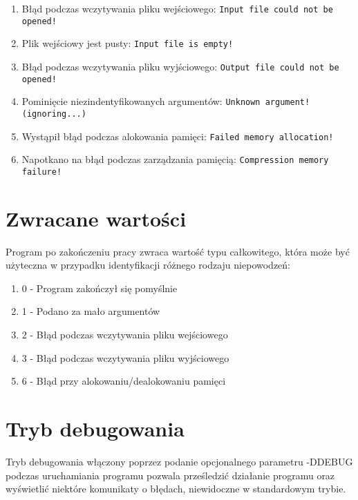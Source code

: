 \documentclass[]{article}
\begin{document}
\begin{enumerate}
\def\labelenumi{\arabic{enumi}.}
\item
  Błąd podczas wczytywania pliku wejściowego: \texttt{Input file could not be opened!}
\item
Plik wejściowy jest pusty: \texttt{Input file is empty!}
\item
Błąd podczas wczytywania pliku wyjściowego:  \texttt{Output file could not be opened!}
\item
Pominięcie niezindentyfikowanych argumentów: \texttt{Unknown argument! (ignoring...)}
\item
Wystąpił błąd podczas alokowania pamięci: \texttt{Failed memory allocation!}
\item
Napotkano na błąd podczas zarządzania pamięcią: \texttt{Compression memory failure!}

\end{enumerate}

\section{Zwracane wartości}\label{header-n281}

Program po zakończeniu pracy zwraca wartość typu całkowitego, która może być użyteczna w przypadku identyfikacji różnego rodzaju niepowodzeń:

\begin{enumerate}
\def\labelenumi{\arabic{enumi}.}
\item
0 - Program zakończył się pomyślnie
\item
1 - Podano za mało argumentów
\item
2 - Błąd podczas wczytywania pliku wejściowego
\item
3 - Błąd podczas wczytywania pliku wyjściowego
\item
6 - Błąd przy alokowaniu/dealokowaniu pamięci

\end{enumerate}
\section{Tryb debugowania}\label{header-n281}
Tryb debugowania włączony poprzez podanie opcjonalnego parametru -DDEBUG podczas uruchamiania programu pozwala prześledzić działanie programu oraz wyświetlić niektóre komunikaty o błędach, niewidoczne w standardowym trybie.
\end{document}
